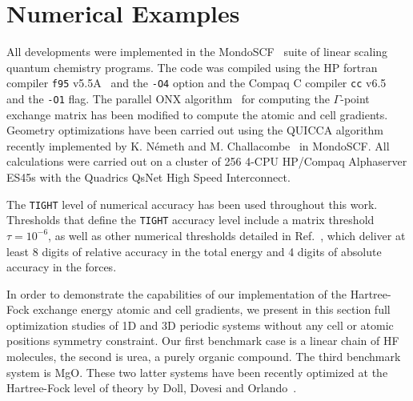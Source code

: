 \documentclass[prl,preprint,doublespace]{revtex4} %
\begin{document}
\section{Numerical Examples}\label{Sec:NumExamples}
All developments were implemented in the {\sc MondoSCF}~\cite{MondoSCF} suite of
linear scaling quantum chemistry programs. 
The code was compiled using the HP fortran compiler {\tt f95}
v5.5A~\cite{f95-v5.5a} and the {\tt -O4} option and the Compaq
C compiler {\tt cc} v6.5~\cite{cc-v6.5} and the {\tt -O1} flag.
The parallel ONX algorithm~\cite{VWeber05a} for computing
the $\Gamma$-point exchange matrix has been modified to compute
the atomic and cell gradients.
Geometry optimizations have been carried out using the QUICCA algorithm recently
implemented by K. N\'emeth and M. Challacombe~\cite{KNemeth04,KNemeth05} in {\sc MondoSCF}. 
All calculations were carried out on a cluster of 256 4-CPU HP/Compaq
Alphaserver ES45s with the Quadrics QsNet High Speed Interconnect.



The {\tt TIGHT} level of numerical accuracy has been used throughout this work.  
Thresholds that define the {\tt TIGHT} accuracy level include a matrix 
threshold $\tau=10^{-6}$, as well as other numerical thresholds 
detailed in Ref.~\cite{CTymczak04a}, which deliver at least 8 digits of 
relative accuracy in the total energy and 4 digits of absolute accuracy 
in the forces.  

In order to demonstrate the capabilities of our implementation of the
Hartree-Fock exchange energy atomic and cell gradients, we present in this section 
full optimization studies of 1D and 3D periodic systems without any cell 
or atomic positions symmetry constraint. 
Our first benchmark case is a linear chain of HF molecules, the second is
urea, a purely organic compound. The third benchmark system is MgO. 
These two latter systems have been recently optimized at the Hartree-Fock 
level of theory by Doll, Dovesi and Orlando~\cite{KDoll04}.
\end{document}
